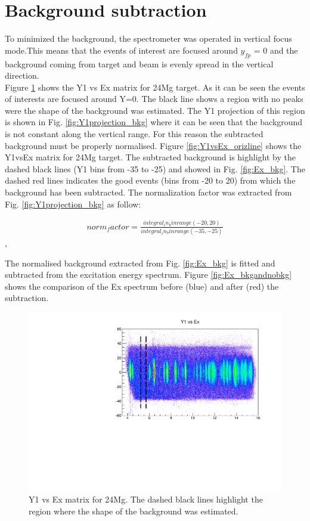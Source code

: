 \documentclass[]{report}
\begin{document}
\section{Background subtraction}

To minimized the background, the spectrometer was operated in vertical focus mode.This means that the events of interest are focused around $y_{fp}$ = 0 and the background coming from target and beam is evenly spread in the vertical direction.\\
Figure \ref{fig:Y1vsEx_vertline} shows the Y1 vs Ex matrix for 24Mg target. As it can be seen the events of interests are focused around Y=0. The black line shows a region with no peaks were the shape of the background was estimated. The Y1 projection of this region is shown in Fig. \ref{fig:Y1projection_bkg} where it can be seen that the background is not constant along the vertical range. For this reason the subtracted background must be properly normalised. Figure \ref{fig:Y1vsEx_orizline} shows the Y1vsEx matrix for 24Mg target. The subtracted background is highlight by the dashed black lines (Y1 bins from -35 to -25) and showed in Fig. \ref{fig:Ex_bkg}. The dashed red lines indicates the good events (bins from -20 to 20) from which the background has been subtracted.
The normalization factor was extracted from Fig. \ref{fig:Y1projection_bkg} as follow:

\begin{eqnarray}
norm_factor = \frac{integral_in_binrange(-20,20)}{integral_in_binrange(-35,-25)}
\end{eqnarray},

The normalised background extracted from Fig. \ref{fig:Ex_bkg} is fitted and subtracted from the excitation energy spectrum. Figure \ref{fig:Ex_bkgandnobkg} shows the comparison of the Ex spectrum before (blue) and after (red) the subtraction.

		\begin{figure}
			\includegraphics[width=\linewidth]{Figure/bkg/Chained_24Mg_Y1vsEx_2.pdf}
			\caption{Y1 vs Ex matrix for 24Mg. The dashed black lines highlight the region where the shape of the background was estimated.}
			\label{fig:Y1vsEx_vertline}
		\end{figure}
		
\end{document}
